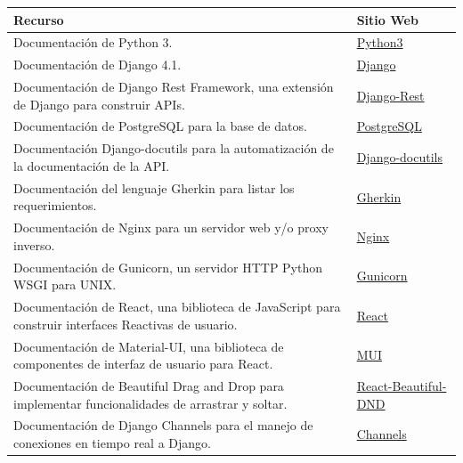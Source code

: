 \begin{table}[H]
    \centering
    \begin{tabular}{|p{11cm}|p{4cm}|}
        \hline
        \textbf{Recurso} & \textbf{Sitio Web} \\
        \hline
        Documentación de Python 3. & \href{https://docs.python.org/3/}{Python3} \\
        \hline
        Documentación de Django 4.1. & \href{https://docs.djangoproject.com/en/4.1/}{Django} \\
        \hline
        Documentación de Django Rest Framework, una extensión de Django para construir APIs. & \href{https://www.django-rest-framework.org/#quickstart}{Django-Rest} \\
        \hline
        Documentación de PostgreSQL para la base de datos. & \href{https://www.postgresql.org/docs/current/}{PostgreSQL} \\
        \hline
        Documentación Django-docutils para la automatización de la documentación de la API. & \href{https://docs.djangoproject.com/en/4.1/ref/contrib/admin/admindocs/}{Django-docutils} \\
        \hline
        Documentación del lenguaje Gherkin para listar los requerimientos. & \href{https://docs.behat.org/en/v2.5/guides/1.gherkin.html}{Gherkin} \\
        \hline
        Documentación de Nginx para un servidor web y/o proxy inverso. & \href{http://nginx.org/en/docs/}{Nginx} \\
        \hline
        Documentación de Gunicorn, un servidor HTTP Python WSGI para UNIX. &
        \href{https://gunicorn.org/#docs}{Gunicorn} \\
        \hline
        Documentación de React, una biblioteca de JavaScript para construir interfaces Reactivas de usuario. & \href{https://es.react.dev/reference/react}{React}\\
        \hline
        Documentación de Material-UI, una biblioteca de componentes de interfaz de usuario para React. & \href{https://mui.com/material-ui/getting-started/}{MUI} \\
        \hline
        Documentación de Beautiful Drag and Drop para implementar funcionalidades de arrastrar y soltar. & \href{https://github.com/atlassian/react-beautiful-dnd}{React-Beautiful-DND} \\
        \hline
        Documentación de Django Channels para el manejo de conexiones en tiempo real a Django. & \href{https://channels.readthedocs.io/en/latest/}{Channels} \\

\end{tabular}
\end{table}
